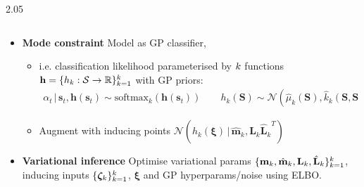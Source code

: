 \documentclass[final,11pt]{beamer}
\newlength{\colwidth}
\newcommand{\E}{\mathbb{E}}    %
\newcommand{\R}{\mathbb{R}}    %
\renewcommand{\mid}{\,|\,}
\DeclareMathOperator{\R}{\mathbb{R}}
\DeclareMathOperator{\E}{\mathbb{E}}
\newcommand{\numData}{\ensuremath{t}}
\newcommand{\modeInd}{\ensuremath{k}}
\newcommand{\NumData}{\ensuremath{\MakeUppercase{\numData}}}
\newcommand{\ModeInd}{\ensuremath{\MakeUppercase{\modeInd}}}
\newcommand{\singleData}[1]{\ensuremath{#1_{\numData}}}
\newcommand{\mode}[1]{\ensuremath{#1_{\modeInd}}}
\newcommand{\state}{\ensuremath{\mathbf{x}}}
\newcommand{\x}{\ensuremath{\mathbf{x}}}
\newcommand{\y}{\ensuremath{y}}
\newcommand{\dataset}{\ensuremath{\mathcal{D}}}
\newcommand{\singleInput}{\ensuremath{\x_{\numData-1}}}
\newcommand{\singleOutput}{\ensuremath{\singleData{\y}}}
\newcommand{\modeVar}{\ensuremath{\alpha}}
\newcommand{\gatingFunc}{\ensuremath{h}}
\newcommand{\GatingFunc}{\ensuremath{\mathbf{\gatingFunc}}}
\newcommand{\latentFunc}{\ensuremath{f}}
\newcommand{\timeInd}{\ensuremath{t}}
\newcommand{\stateDomain}{\ensuremath{\mathcal{S}}}
\renewcommand{\state}{\ensuremath{\mathbf{s}}}
\renewcommand{\mode}[1]{\ensuremath{#1_{\modeInd}}}
\newcommand{\singleModeVar}{\ensuremath{\singleData{\modeVar}}}
\newcommand{\singleModeVarK}{\ensuremath{\singleModeVar = \modeInd}}
\renewcommand{\numData}{\ensuremath{n}}
\renewcommand{\NumData}{\ensuremath{N}}
\renewcommand{\singleOutput}{\ensuremath{y_{\numData}}}
\renewcommand{\singleInput}{\ensuremath{\mathbf{x}_{\numData}}}
\newcommand{\gatingMeanFunc}{\ensuremath{\mode{\hat{\mu}}}}
\newcommand{\gatingCovFunc}{\ensuremath{\mode{\hat{k}}}}
\newcommand{\singleGatingLikelihood}{\ensuremath{\Pr\left(\singleModeVarK \mid \GatingFunc(\singleInput) \right)}}
\newcommand{\expertInducingInput}{\ensuremath{\mode{\bm{\zeta}}}}
\newcommand{\expertsInducingInput}{\ensuremath{\bm{\zeta}}}
\newcommand{\gatingInducingInput}{\ensuremath{\bm{\xi}}}
\newcommand{\gatingInducingOutput}{\ensuremath{\mode{\gatingFunc}(\gatingInducingInput)}}
\newcommand{\gatingInducingPrior}{\ensuremath{p(\gatingInducingOutput)}}
\newcommand{\gatingInducingVariational}{\ensuremath{q(\gatingInducingOutput)}}
\newcommand{\gatingsVariational}{\ensuremath{q(\GatingFunc(\singleInput))}}
\newcommand{\expertsKL}{\ensuremath{\sum_{\modeInd=1}^\ModeInd\text{KL}\left( \expertInducingVariational \mid\mid \expertInducingPrior \right)}}
\newcommand{\gatingsKL}{\ensuremath{\sum_{\modeInd=1}^\ModeInd \text{KL}\left( \gatingInducingVariational \mid\mid \gatingInducingPrior \right)}}
\renewcommand{\dataset}{\ensuremath{\mathcal{D}}}
\renewcommand{\numData}{\ensuremath{t}}
\renewcommand{\singleInput}{\ensuremath{\hat{\mathbf{s}}_{\timeInd}}}
\renewcommand{\singleOutput}{\ensuremath{\Delta\mathbf{s}_{\timeInd+1}}}
\newcommand{\expertInducingPrior}{\ensuremath{p(\mode{\latentFunc}(\expertInducingInput))}}
\newcommand{\singleExpertGivenInducing}{\ensuremath{p(\singleOutput \mid \mode{\latentFunc}(\expertInducingInput))}}
\newcommand{\expertInducingVariational}{\ensuremath{q(\mode{\latentFunc}(\expertInducingInput))}}
\newcommand{\expertsInducingVariational}{\ensuremath{q(\mathbf{\latentFunc}(\expertsInducingInput))}}
\renewcommand{\singleModeVar}{\ensuremath{\modeVar_{\timeInd}}}
\begin{document}
\begin{frame}[t]
\begin{columns}[t]
\begin{column}{2.05\colwidth}
\begin{columns}[t]
\begin{column}{\colwidth}
\begin{itemize}
      \item \textbf{Mode constraint} Model as GP classifier,
      \begin{itemize}
            \item i.e. classification
            likelihood parameterised by $\ModeInd$ functions $\GatingFunc = \{ \mode{\gatingFunc}: \stateDomain \rightarrow \R \}_{\modeInd=1}^{\ModeInd}$ with GP priors:
        \begin{align}
          \modeVar_{t} \mid \state_{t}, \GatingFunc(\state_{t}) \sim \text{softmax}_{\modeInd}(\GatingFunc(\state_{t}))
          \qquad
          \mode{\gatingFunc}(\mathbf{S}) \sim  \mathcal{N} \left(\mode{\hat{\mu}}(\mathbf{S}), \mode{\hat{k}}(\mathbf{S},\mathbf{S}) \right)
        \end{align}
        \item Augment with inducing points $\mathcal{N}(\gatingInducingOutput \mid \mode{\hat{\mathbf{m}}}, \mode{\hat{\mathbf{L}}} \mode{\hat{\mathbf{L}}}^{T})$
      \end{itemize}
      \item \textbf{Variational inference} Optimise variational params $\{\mode{\mathbf{m}}, \mode{\hat{\mathbf{m}}}, \mode{\mathbf{L}}, \mode{\hat{\mathbf{L}}} \}_{\modeInd=1}^{\ModeInd}$,
        inducing inputs $\{\expertInducingInput\}_{\modeInd=1}^{\ModeInd}$, $\gatingInducingInput$ and GP hyperparams/noise using ELBO.


\end{itemize}
\end{column}
\end{columns}
\end{column}
\end{columns}
\end{frame}
\end{document}

